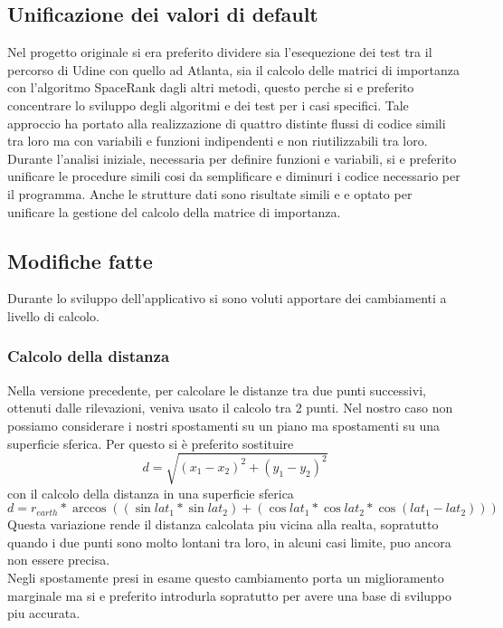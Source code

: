\subsection{Unificazione dei valori di default}
Nel progetto originale si era preferito dividere sia l'esequezione dei test tra il percorso di Udine con quello ad Atlanta,
sia il calcolo delle matrici di importanza con l'algoritmo SpaceRank dagli altri metodi, questo perche si e preferito
concentrare lo sviluppo degli algoritmi e dei test per i casi specifici.
Tale approccio ha portato alla realizzazione di quattro distinte flussi di codice simili tra loro ma con variabili e funzioni
indipendenti e non riutilizzabili tra loro.\\
Durante l'analisi iniziale, necessaria per definire funzioni e variabili, si e preferito unificare le procedure simili cosi da
semplificare e diminuri i codice necessario per il programma. Anche le strutture dati sono risultate simili e e optato per
unificare la gestione del calcolo della matrice di importanza.\\

\subsection{Modifiche fatte}
Durante lo sviluppo dell'applicativo si sono voluti apportare dei cambiamenti
a livello di calcolo.
\subsubsection{Calcolo della distanza}
Nella versione precedente, per calcolare le distanze tra due punti successivi,
ottenuti dalle rilevazioni, veniva usato il calcolo tra 2 punti. Nel nostro caso
non possiamo considerare i nostri spostamenti su un piano ma spostamenti su una
superficie sferica. Per questo si è preferito sostituire
\begin{equation}
d =  \sqrt{(x_{1}-x_{2})^2 + (y_{1}-y_{2})^2}
\end{equation}
con il calcolo della distanza in una superficie sferica
\begin{equation}
d = r_{earth} * \arccos{( (\sin{lat_{1}} * \sin{lat_{2}}) + (\cos{lat_{1}} * \cos{lat_{2}} * \cos{(lat_{1} - lat_{2})} ) )}
\end{equation}
Questa variazione rende il distanza calcolata piu vicina alla realta, sopratutto
quando i due punti sono molto lontani tra loro, in alcuni casi limite, puo ancora non essere precisa.\\
Negli spostamente presi in esame questo cambiamento porta un miglioramento marginale ma si e preferito
introdurla sopratutto per avere una base di sviluppo piu accurata.

